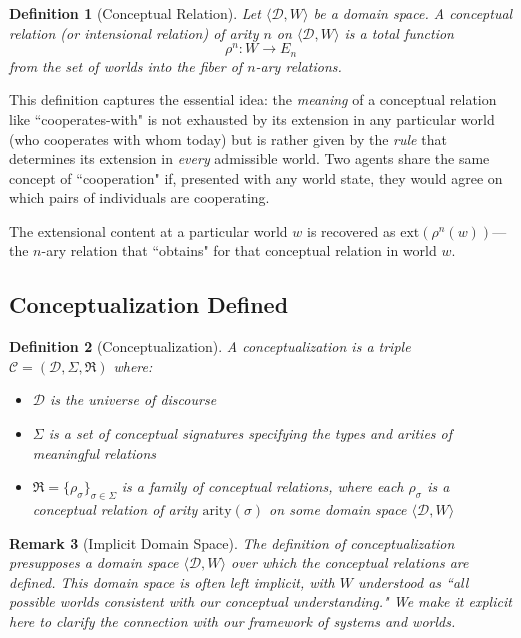 \documentclass[12pt,a4paper]{article}
\newtheorem{definition}{Definition}[section]
\newtheorem{remark}[definition]{Remark}
\newcommand{\domain}{\mathcal{D}}
\newcommand{\concept}{\mathcal{C}}
\newcommand{\intrel}{\mathfrak{R}}
\begin{document}
\begin{definition}[Conceptual Relation]
\label{def:conceptual-relation}
Let $\langle \domain, W \rangle$ be a domain space. A \emph{conceptual relation} (or \emph{intensional relation}) of arity $n$ on $\langle \domain, W \rangle$ is a total function
$$
\rho^n : W \to E_n
$$
from the set of worlds into the fiber of $n$-ary relations.
\end{definition}

This definition captures the essential idea: the \emph{meaning} of a conceptual relation like ``cooperates-with" is not exhausted by its extension in any particular world (who cooperates with whom today) but is rather given by the \emph{rule} that determines its extension in \emph{every} admissible world. Two agents share the same concept of ``cooperation" if, presented with any world state, they would agree on which pairs of individuals are cooperating.

The extensional content at a particular world $w$ is recovered as $\mathrm{ext}(\rho^n(w))$---the $n$-ary relation that ``obtains" for that conceptual relation in world $w$.

\subsection{Conceptualization Defined}

\begin{definition}[Conceptualization]
\label{def:conceptualization}
A \emph{conceptualization} is a triple $\concept = (\domain, \Sigma, \intrel)$ where:
\begin{itemize}
    \item $\domain$ is the universe of discourse
    \item $\Sigma$ is a set of \emph{conceptual signatures} specifying the types and arities of meaningful relations
    \item $\intrel = \{\rho_\sigma\}_{\sigma \in \Sigma}$ is a family of \emph{conceptual relations}, where each $\rho_\sigma$ is a conceptual relation of arity $\text{arity}(\sigma)$ on some domain space $\langle \domain, W \rangle$
\end{itemize}
\end{definition}

\begin{remark}[Implicit Domain Space]
The definition of conceptualization presupposes a domain space $\langle \domain, W \rangle$ over which the conceptual relations are defined. This domain space is often left implicit, with $W$ understood as ``all possible worlds consistent with our conceptual understanding." We make it explicit here to clarify the connection with our framework of systems and worlds.
\end{remark}
\end{document}
